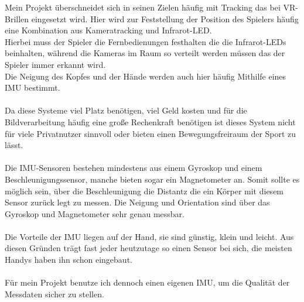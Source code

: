 Mein Projekt überschneidet sich in seinen Zielen häufig 
mit Tracking das bei VR-Brillen eingesetzt wird. Hier wird
zur Feststellung der Position des Spielers häufig eine 
Kombination aus Kameratracking und Infrarot-LED. \\
Hierbei muss der Spieler die Fernbedienungen festhalten die
die Infrarot-LEDs beinhalten, während die Kameras im Raum 
so verteilt werden müssen das der Spieler immer erkannt wird.\\
Die Neigung des Kopfes und der Hände werden auch hier häufig 
Mithilfe eines IMU bestimmt.\\
\\
Da diese Systeme viel Platz benötigen, viel Geld kosten und 
für die Bildverarbeitung häufig eine große Rechenkraft benötigen
ist dieses System nicht für viele Privatnutzer sinnvoll oder 
bieten einen Bewegungsfreiraum der Sport zu lässt.\\
\\
Die IMU-Sensoren bestehen mindestens aus einem Gyroskop und einem 
Beschleunigungssensor, manche bieten sogar ein Magnetometer an.
Somit sollte es möglich sein, über die
Beschleunigung die Distantz die ein Körper mit diesem Sensor zurück
legt zu messen. Die Neigung und Orientation sind über das Gyroskop 
und Magnetometer sehr genau messbar.\\
\\
Die Vorteile der IMU liegen auf der Hand, sie sind günstig, klein
und leicht. Aus diesen Gründen trägt fast jeder heutzutage 
so einen Sensor bei sich, die meisten Handys haben ihn schon eingebaut.\\
\\
Für mein Projekt benutze ich dennoch einen eigenen IMU, um die
Qualität der Messdaten sicher zu stellen.